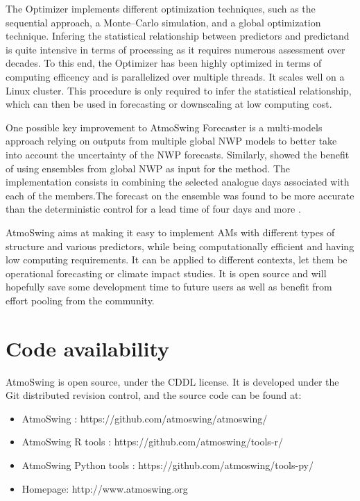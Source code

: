 \documentclass[review]{elsarticle}
\begin{document}
The Optimizer implements different optimization techniques, such as the sequential approach, a Monte--Carlo simulation, and a global optimization technique. Infering the statistical relationship between predictors and predictand is quite intensive in terms of processing as it requires numerous assessment over decades. To this end, the Optimizer has been highly optimized in terms of computing efficency and is parallelized over multiple threads. It scales well on a Linux cluster. This procedure is only required to infer the statistical relationship, which can then be used in forecasting or downscaling at low computing cost. 

One possible key improvement to AtmoSwing Forecaster is a multi-models approach relying on outputs from multiple global NWP models to better take into account the uncertainty of the NWP forecasts. Similarly, \citet{Thevenot2004} showed the benefit of using ensembles from global NWP as input for the method. The implementation consists in combining the selected analogue days associated with each of the members.The forecast on the ensemble was found to be more accurate than the deterministic control for a lead time of four days and more \citep{Thevenot2004}. 

AtmoSwing aims at making it easy to implement AMs with different types of structure and various predictors, while being computationally efficient and having low computing requirements. It can be applied to different contexts, let them be operational forecasting or climate impact studies. It is open source and will hopefully save some development time to future users as well as benefit from effort pooling from the community.


\section*{Code availability}

AtmoSwing is open source, under the CDDL license. It is developed under the Git distributed revision control, and the source code can be found at:

\begin{itemize}
	\item AtmoSwing \citep{Horton2018c}: https://github.com/atmoswing/atmoswing/
	\item AtmoSwing R tools \citep{Horton2018d}: https://github.com/atmoswing/tools-r/
	\item AtmoSwing Python tools \citep{Horton2018e}: https://github.com/atmoswing/tools-py/
	\item Homepage: http://www.atmoswing.org
\end{itemize}
\end{document}
